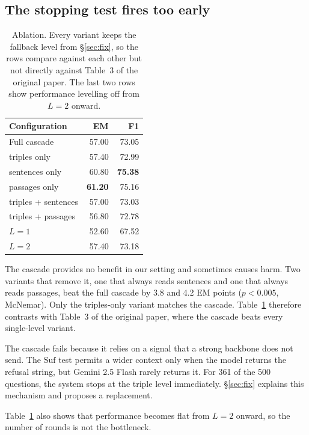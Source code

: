 \documentclass[11pt]{article}
\begin{document}
\subsection{The stopping test fires too early}
\label{sec:limit-suf}

\begin{table}[t]
\centering\small
\begin{tabular}{lrr}
\toprule
\textbf{Configuration} & \textbf{EM} & \textbf{F1} \\
\midrule
Full cascade              & 57.00 & 73.05 \\
\midrule
\quad triples only        & 57.40 & 72.99 \\
\quad sentences only      & 60.80 & \textbf{75.38} \\
\quad passages only       & \textbf{61.20} & 75.16 \\
\quad triples + sentences & 57.00 & 73.03 \\
\quad triples + passages  & 56.80 & 72.78 \\
\midrule
\quad $L=1$               & 52.60 & 67.52 \\
\quad $L=2$               & 57.40 & 73.18 \\
\bottomrule
\end{tabular}
\caption{Ablation. Every variant keeps the fallback level from \S\ref{sec:fix}, so the rows
compare against each other but not directly against Table~3 of the original paper. The last
two rows show performance levelling off from $L{=}2$ onward.}
\label{tab:ablation}
\end{table}

The cascade provides no benefit in our setting and sometimes causes harm. Two variants that
remove it, one that always reads sentences and one that always reads passages, beat the full
cascade by 3.8 and 4.2 EM points ($p < 0.005$, McNemar). Only the triples-only variant matches
the cascade. Table~\ref{tab:ablation} therefore contrasts with Table~3 of the original paper,
where the cascade beats every single-level variant.

The cascade fails because it relies on a signal that a strong backbone does not send. The
$\mathrm{Suf}$ test permits a wider context only when the model returns the refusal string,
but Gemini 2.5 Flash rarely returns it. For 361 of the 500 questions, the system stops at the
triple level immediately. \S\ref{sec:fix} explains this mechanism and proposes a
replacement.

Table~\ref{tab:ablation} also shows that performance becomes flat from $L{=}2$ onward, so the
number of rounds is not the bottleneck.
\end{document}
